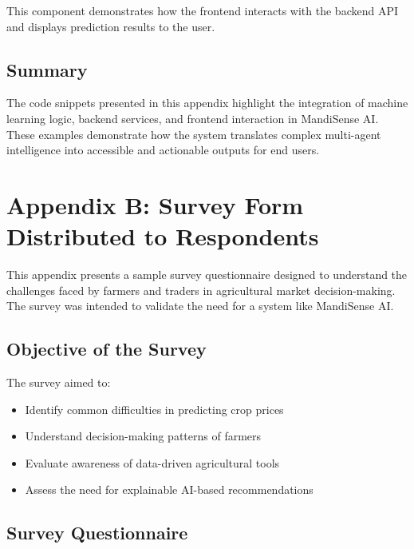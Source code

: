 \documentclass[12pt,a4paper]{report}
\begin{document}
This component demonstrates how the frontend interacts with the backend API and displays prediction results to the user.

\section*{Summary}

The code snippets presented in this appendix highlight the integration of machine learning logic, backend services, and frontend interaction in MandiSense AI. These examples demonstrate how the system translates complex multi-agent intelligence into accessible and actionable outputs for end users.

\chapter{Appendix B: Survey Form Distributed to Respondents}

This appendix presents a sample survey questionnaire designed to understand the challenges faced by farmers and traders in agricultural market decision-making. The survey was intended to validate the need for a system like MandiSense AI.

\section{Objective of the Survey}

The survey aimed to:
\begin{itemize}
    \item Identify common difficulties in predicting crop prices
    \item Understand decision-making patterns of farmers
    \item Evaluate awareness of data-driven agricultural tools
    \item Assess the need for explainable AI-based recommendations
\end{itemize}

\section{Survey Questionnaire}
\end{document}
